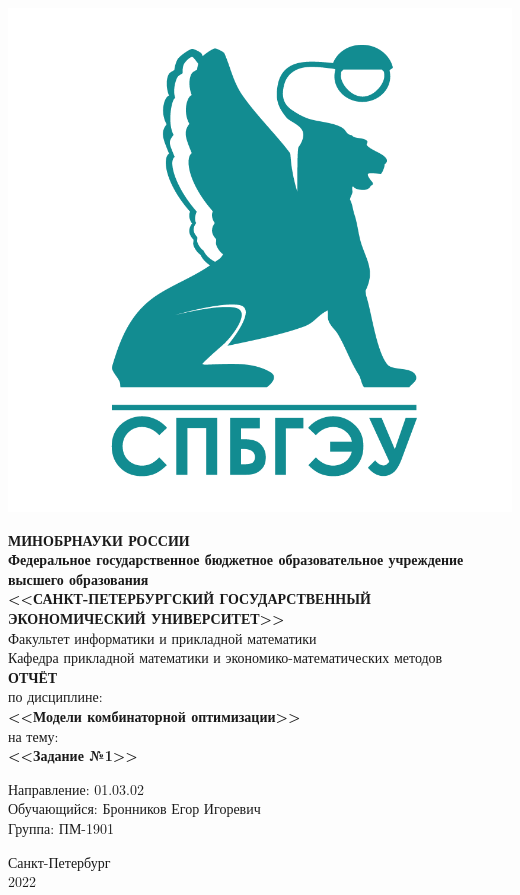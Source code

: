 \documentclass[14pt,fleqn]{extarticle}
\begin{document}
	\begin{titlepage}
		\includegraphics[scale=0.12]{logo}
		\begin{center}
			\textbf{МИНОБРНАУКИ РОССИИ}\\
			\vspace{0.2cm}
			\textbf{Федеральное государственное бюджетное образовательное учреждение высшего образования}\\
			\textbf{<<САНКТ-ПЕТЕРБУРГСКИЙ ГОСУДАРСТВЕННЫЙ ЭКОНОМИЧЕСКИЙ УНИВЕРСИТЕТ>>}\\
			\vspace{0.6cm}
			Факультет информатики и прикладной математики\\
			Кафедра прикладной математики и экономико-математических методов\\
			\vspace{1cm}
			\textbf{ОТЧЁТ}\\
			по дисциплине:\\
			\textbf{<<Модели комбинаторной оптимизации>>}\\
			на тему:\\
			\textbf{<<Задание №1>>}\\
		\end{center}
		\vspace{1cm}
		Направление: 01.03.02\\
		Обучающийся: Бронников Егор Игоревич\\
		Группа: ПМ-1901\\
		\vfill
		\begin{center}
			Санкт-Петербург\\
			2022\\
		\end{center}
	\end{titlepage}
\end{document}
